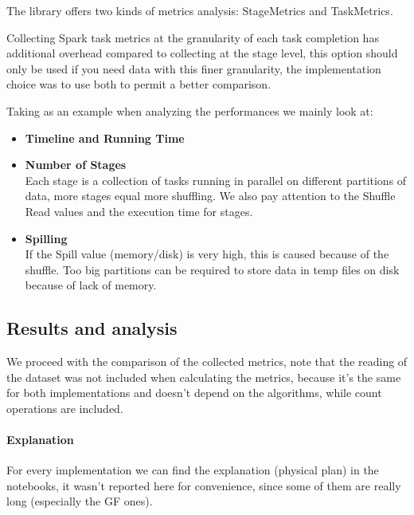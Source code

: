 \documentclass[a4paper,11pt, twoside]{article}
\begin{document}
        \noindent
        The library offers two kinds of metrics analysis: StageMetrics and TaskMetrics. 
    
        Collecting Spark task metrics at the granularity of each task completion has additional overhead compared to collecting at the stage level, this option should only be used if you need data with this finer granularity, the implementation choice was to use both to permit a better comparison. \cite{sparkmeasure}
    
        \bigskip
        \noindent
        Taking \cite{Sharafeldeen2023} as an example when analyzing the performances we mainly look at:
        \begin{itemize}
            \item \textbf{Timeline and Running Time}
            \item \textbf{Number of Stages}\\ Each stage is a collection of tasks running in parallel on different partitions of data, more stages equal more shuffling. We also pay attention to the Shuffle Read values and the execution time for stages.
            \item \textbf{Spilling}\\  If the Spill value (memory/disk) is very high, this is caused because of the shuffle. Too big partitions can be required to store data in temp files on disk because of lack of memory.
        \end{itemize}
            
    \newpage
    	\subsection{Results and analysis}
            We proceed with the comparison of the collected metrics, note that the reading of the dataset was not included when calculating the metrics, because it's the same for both implementations and doesn't depend on the algorithms, while count operations are included.
            
            \paragraph{Explanation}
            For every implementation we can find the explanation (physical plan) in the notebooks, it wasn't reported here for convenience, since some of them are really long (especially the GF ones).
            \bigskip
            
\end{document}
